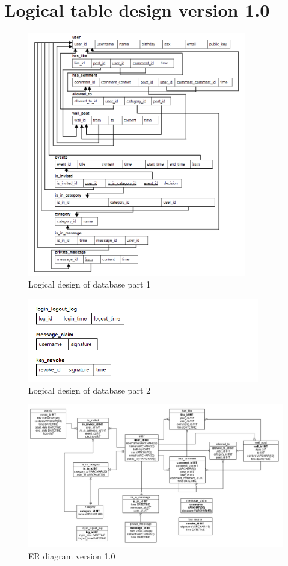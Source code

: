 \section{Logical table design version 1.0}
\begin{figure}[h]
    \includegraphics[width=0.85\textwidth]{images/design/logical_diagram.png}
    \caption{Logical design of database part 1}
    \label{fig:db_er_diag}
\end{figure}

\clearpage

\begin{figure}[h]
    \includegraphics[width=0.9\textwidth]{images/design/logical_diagram2.png}
    \caption{Logical design of database part 2}
    \label{fig:db_er_diag}
\end{figure}

\clearpage

\begin{landscape}
\begin{figure}[h]
    \includegraphics[width=1.4\textwidth]{images/design/project_er_diagram.png}
    \caption{ER diagram version 1.0}
    \label{fig:db_er_diag}
\end{figure}
\end{landscape}
